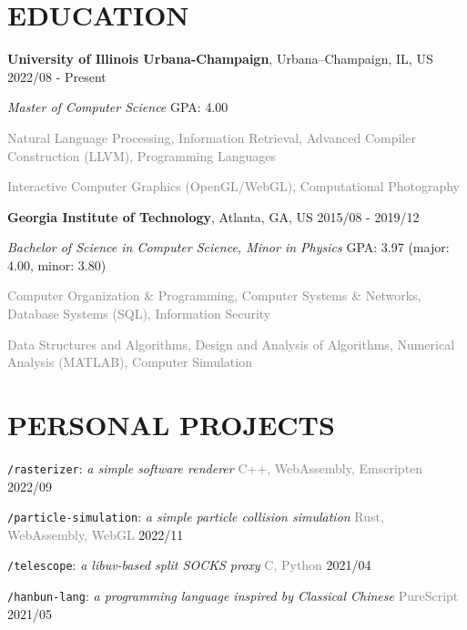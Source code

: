 \documentclass[10pt]{article}
\begin{document}
\section*{EDUCATION}
\textbf{University of Illinois Urbana-Champaign}, Urbana–Champaign, IL, US  \hfill 2022/08 - Present

\textit{Master of Computer Science}  \hfill GPA: 4.00

\vspace{0.5em}
\textcolor{gray}{Natural Language Processing, Information Retrieval, Advanced Compiler Construction (LLVM), Programming Languages}

\textcolor{gray}{Interactive Computer Graphics (OpenGL/WebGL), Computational Photography}

\vspace{1em}
\textbf{Georgia Institute of Technology}, Atlanta, GA, US \hfill 2015/08 - 2019/12

\textit{Bachelor of Science in Computer Science, Minor in Physics} \hfill GPA: 3.97 (major: 4.00, minor: 3.80)

\vspace{0.5em}
\textcolor{gray}{Computer Organization \& Programming, Computer Systems \& Networks, Database Systems (SQL), Information Security}

\textcolor{gray}{Data Structures and Algorithms, Design and Analysis of Algorithms, Numerical Analysis (MATLAB), Computer Simulation}


\section*{PERSONAL PROJECTS}

\vspace{0.5em}
\texttt{/rasterizer}: \textit{a simple software renderer} \hfill \textcolor{gray}{C++, WebAssembly, Emscripten} 2022/09

\vspace{0.5em}
\texttt{/particle-simulation}: \textit{a simple particle collision simulation} \hfill \textcolor{gray}{Rust, WebAssembly, WebGL}  2022/11

\vspace{0.5em}
\texttt{/telescope}: \textit{a libuv-based split SOCKS proxy} \hfill \textcolor{gray}{C, Python}  2021/04

\vspace{0.5em}
\texttt{/hanbun-lang}: \textit{a programming language inspired by Classical Chinese} \hfill \textcolor{gray}{PureScript}  2021/05
\end{document}
